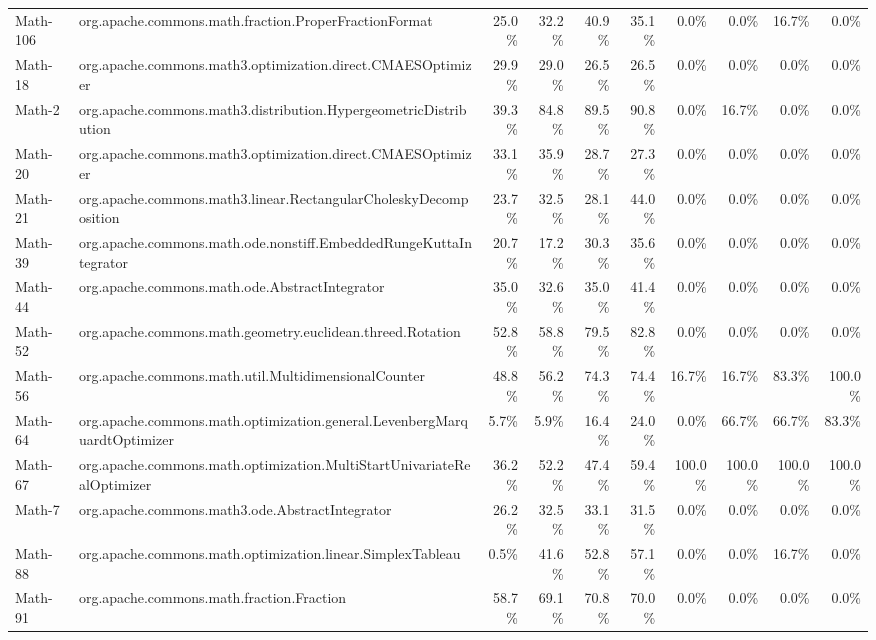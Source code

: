 \begin{tabular}{ ll rrrr rrrr}
Math-106 &  org.apache.commons.math.fraction.ProperFractionFormat &  25.0\% &  32.2\% &  40.9\% &  35.1\% &  0.0\% &  0.0\% &  16.7\% &  0.0\%\\ 
Math-18 &  org.apache.commons.math3.optimization.direct.CMAESOptimizer &  29.9\% &  29.0\% &  26.5\% &  26.5\% &  0.0\% &  0.0\% &  0.0\% &  0.0\%\\ 
Math-2 &  org.apache.commons.math3.distribution.HypergeometricDistribution &  39.3\% &  84.8\% &  89.5\% &  90.8\% &  0.0\% &  16.7\% &  0.0\% &  0.0\%\\ 
Math-20 &  org.apache.commons.math3.optimization.direct.CMAESOptimizer &  33.1\% &  35.9\% &  28.7\% &  27.3\% &  0.0\% &  0.0\% &  0.0\% &  0.0\%\\ 
Math-21 &  org.apache.commons.math3.linear.RectangularCholeskyDecomposition &  23.7\% &  32.5\% &  28.1\% &  44.0\% &  0.0\% &  0.0\% &  0.0\% &  0.0\%\\ 
Math-39 &  org.apache.commons.math.ode.nonstiff.EmbeddedRungeKuttaIntegrator &  20.7\% &  17.2\% &  30.3\% &  35.6\% &  0.0\% &  0.0\% &  0.0\% &  0.0\%\\ 
Math-44 &  org.apache.commons.math.ode.AbstractIntegrator &  35.0\% &  32.6\% &  35.0\% &  41.4\% &  0.0\% &  0.0\% &  0.0\% &  0.0\%\\ 
Math-52 &  org.apache.commons.math.geometry.euclidean.threed.Rotation &  52.8\% &  58.8\% &  79.5\% &  82.8\% &  0.0\% &  0.0\% &  0.0\% &  0.0\%\\ 
Math-56 &  org.apache.commons.math.util.MultidimensionalCounter &  48.8\% &  56.2\% &  74.3\% &  74.4\% &  16.7\% &  16.7\% &  83.3\% &  100.0\%\\ 
Math-64 &  org.apache.commons.math.optimization.general.LevenbergMarquardtOptimizer &  5.7\% &  5.9\% &  16.4\% &  24.0\% &  0.0\% &  66.7\% &  66.7\% &  83.3\%\\ 
Math-67 &  org.apache.commons.math.optimization.MultiStartUnivariateRealOptimizer &  36.2\% &  52.2\% &  47.4\% &  59.4\% &  100.0\% &  100.0\% &  100.0\% &  100.0\%\\ 
Math-7 &  org.apache.commons.math3.ode.AbstractIntegrator &  26.2\% &  32.5\% &  33.1\% &  31.5\% &  0.0\% &  0.0\% &  0.0\% &  0.0\%\\ 
Math-88 &  org.apache.commons.math.optimization.linear.SimplexTableau &  0.5\% &  41.6\% &  52.8\% &  57.1\% &  0.0\% &  0.0\% &  16.7\% &  0.0\%\\ 
Math-91 &  org.apache.commons.math.fraction.Fraction &  58.7\% &  69.1\% &  70.8\% &  70.0\% &  0.0\% &  0.0\% &  0.0\% &  0.0\%\\ 

\end{tabular}
